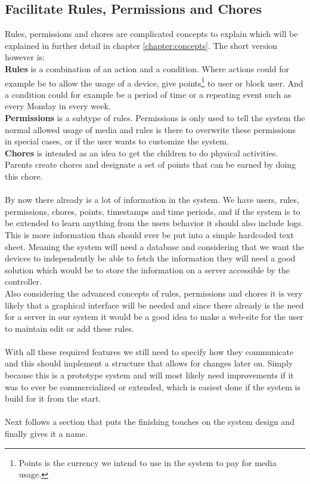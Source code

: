 \subsection{Facilitate Rules, Permissions and Chores}
Rules, permissions and chores are complicated concepts to explain which will be explained in further detail in chapter \ref{chapter:concepts}. The short version however is:\\
\textbf{Rules} is a combination of an action and a condition. Where actions could for example be to allow the usage of a device, give points\footnote{Points is the currency we intend to use in the system to pay for media usage.} to user or block user. And a condition could for example be a period of time or a repeating event such as every Monday in every week.\\
\textbf{Permissions} is a subtype of rules. Permissions is only used to tell the system the normal allowed usage of media and rules is there to overwrite these permissions in special cases, or if the user wants to customize the system.\\
\textbf{Chores} is intended as an idea to get the children to do physical activities. Parents create chores and designate a set of points that can be earned by doing this chore.\\
\\
By now there already is a lot of information in the system. We have users, rules, permissions, chores, points, timestamps and time periods, and if the system is to be extended to learn anything from the users behavior it should also include logs.\\
This is more information than should ever be put into a simple hardcoded text sheet. Meaning the system will need a database and considering that we want the devices to independently be able to fetch the information they will need a good solution which would be to store the information on a server accessible by the controller.\\
Also considering the advanced concepts of rules, permissions and chores it is very likely that a graphical interface will be needed and since there already is the need for a server in our system it would be a good idea to make a web-site for the user to maintain edit or add these rules.\\
\\
With all these required features we still need to specify how they communicate and this should implement a structure that allows for changes later on. Simply because this is a prototype system and will most likely need improvements if it was to ever be commercialized or extended, which is easiest done if the system is build for it from the start.\\
\\
Next follows a section that puts the finishing touches on the system design and finally gives it a name.


